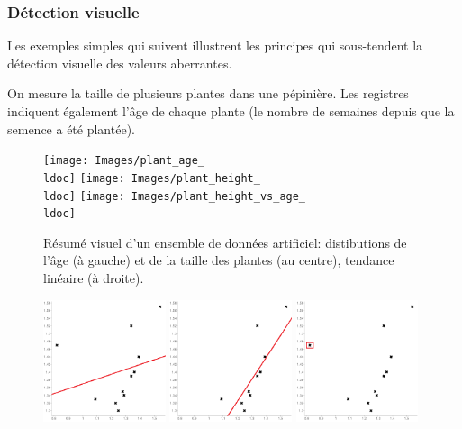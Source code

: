 \subsubsection*{D\'etection visuelle} Les exemples simples qui suivent illustrent les principes qui sous-tendent la détection visuelle des valeurs aberrantes. 
\begin{Exemple} On mesure la taille de plusieurs plantes dans une pépinière. Les registres indiquent également l'âge de chaque plante (le nombre de semaines depuis que la semence a été plantée). 
\begin{figure}[t]
\centering
\texttt{[image: Images/plant\_age\_\\ldoc]}\quad
\texttt{[image: Images/plant\_height\_\\ldoc]}\quad
\texttt{[image: Images/plant\_height\_vs\_age\_\\ldoc]}
\caption{\small R\'esum\'e visuel d'un ensemble de donn\'ees artificiel: distibutions de l'\^age (\`a gauche) et de la taille des plantes (au centre), tendance lin\'eaire (\`a droite).} \label{fig:plant_data}
\end{figure}
\begin{figure}[t]
\centering
\includegraphics[width=0.32\textwidth]{Images/scatter_plot_linear_1}\quad
\includegraphics[width=0.32\textwidth]{Images/scatter_plot_linear_2}\quad
\includegraphics[width=0.32\textwidth]{Images/scatter_plot_2}

\end{figure}
\end{Exemple}

